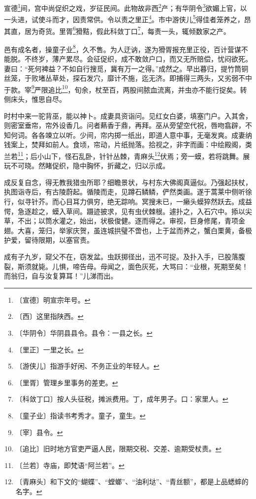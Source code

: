 \documentclass[12pt,UTF-8,openany,a4]{ctexbook}
\begin{document}
\begin{large}
    
    宣德\footnote{〔宣德〕\yiwen 明宣宗年号。}间，宫中尚促织之戏，岁征民间。此物故非西\footnote{〔西〕\yiwen 这里指陕西。}产；有华阴令\footnote{〔华阴令〕\yiwen 华阴县县令。县令：一县之长。}欲媚上官，以一头进，试使斗而才，因责常供。令以责之里正\footnote{〔里正〕\yiwen 一里之长。}。市中游侠儿\footnote{〔游侠儿〕\yiwen 指游手好闲、不务正业的年轻人。}得佳者笼养之，昂其直，居为奇货。里胥\footnote{〔里胥〕\yiwen 管理乡里事务的差吏。}猾黠，假此科敛丁口\footnote{〔科敛丁口〕\yiwen 按人头征税，摊派费用。丁，成年男子。口：家里人。}，每责一头，辄倾数家之产。
    
    邑有成名者，操童子业\footnote{〔童子业〕\yiwen 指读书考秀才。童子，童生。}，久不售。为人迂讷，遂为猾胥报充里正役，百计营谋不能脱。不终岁，薄产累尽。会征促织，成不敢敛户口，而又无所赔偿，忧闷欲死。妻曰：“死何裨益？不如自行搜觅，冀有万一之得。”成然之。早出暮归，提竹筒铜丝笼，于败堵丛草处，探石发穴，靡计不施，迄无济。即捕得三两头，又劣弱不中于款。宰\footnote{〔宰〕\yiwen 县令。}严限追比\footnote{〔追比〕\yiwen 旧时地方官吏严逼人民，限期交税、交差、逾期受杖责。}，旬余，杖至百，两股间脓血流离，并虫亦不能行捉矣。转侧床头，惟思自尽。
    
    时村中来一驼背巫，能以神卜。成妻具资诣问。见红女白婆，填塞门户。入其舍，则密室垂帘，帘外设香几。问者爇香于鼎，再拜。巫从旁望空代祝，唇吻翕辟，不知何词。各各竦立以听。少间，帘内掷一纸出，即道人意中事，无毫发爽。成妻纳钱案上，焚拜如前人。食顷，帘动，片纸抛落。拾视之，非字而画：中绘殿阁，类兰若\footnote{〔兰若〕\yiwen 寺庙，即梵语“阿兰若”。}；后小山下，怪石乱卧，针针丛棘，青麻头\footnote{〔青麻头〕\yiwen 和下文的“蝴蝶”、“螳螂”、“油利垯”、“青丝额”，都是上品蟋蟀的名字。}伏焉；旁一蟆，若将跳舞。展玩不可晓。然睹促织，隐中胸怀，折藏之，归以示成。
    
    成反复自念，得无教我猎虫所耶？细瞻景状，与村东大佛阁真逼似。乃强起扶杖，执图诣寺后，有古陵蔚起。循陵而走，见蹲石鳞鳞，俨然类画。遂于蒿莱中侧听徐行，似寻针芥。而心目耳力俱穷，绝无踪响。冥搜未已，一癞头蟆猝然跃去。成益愕，急逐趁之，蟆入草间。蹑迹披求，见有虫伏棘根。遽扑之，入石穴中。掭以尖草，不出；以筒水灌之，始出，状极俊健。逐而得之。审视，巨身修尾，青项金翅。大喜，笼归，举家庆贺，虽连城拱璧不啻也，上于盆而养之，蟹白栗黄，备极护爱，留待限期，以塞官责。
    
    成有子九岁，窥父不在，窃发盆。虫跃掷径出，迅不可捉。及扑入手，已股落腹裂，斯须就毙。儿惧，啼告母。母闻之，面色灰死，大骂曰：“业根，死期至矣！而翁归，自与汝复算耳！”儿涕而出。
    

\end{large}
\end{document}
